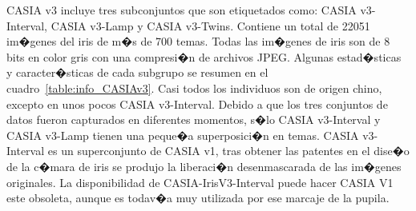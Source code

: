 CASIA v3 incluye tres subconjuntos que son etiquetados como: CASIA v3-Interval, CASIA v3-Lamp y CASIA v3-Twins. Contiene un total de 22051 im�genes del iris de m�s de 700 temas. Todas las im�genes de iris son de 8 bits en color gris con una compresi�n de archivos JPEG. Algunas estad�sticas y caracter�sticas de cada subgrupo se resumen en el cuadro~\ref{table:info_CASIAv3}. Casi todos los individuos son de origen chino, excepto en unos pocos CASIA v3-Interval. Debido a que los tres conjuntos de datos fueron capturados en diferentes momentos, s�lo CASIA v3-Interval y CASIA v3-Lamp tienen una peque�a superposici�n en temas.
CASIA v3-Interval es un superconjunto de CASIA v1, tras obtener las patentes en el dise�o de la c�mara de iris se produjo la liberaci�n desenmascarada de las im�genes originales. La disponibilidad de CASIA-IrisV3-Interval puede hacer CASIA V1 este obsoleta, aunque es todav�a muy utilizada por ese marcaje de la pupila.

\vspace{0.5cm}

